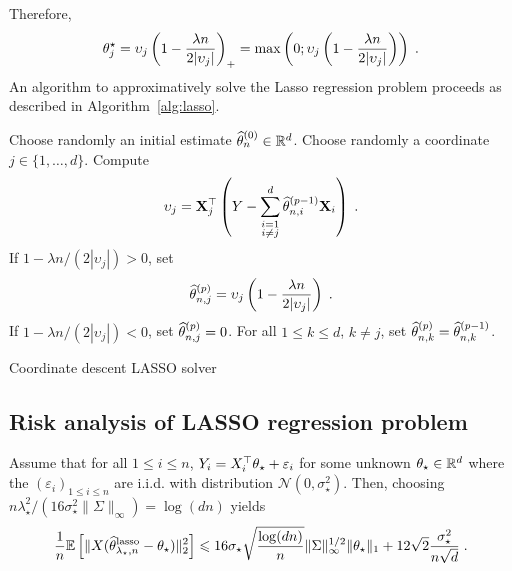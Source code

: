 Therefore,
\[
\theta_j^{\star} = \upsilon_j\left( 1 - \frac{\lambda n}{2 |\upsilon_j|}\right)_+ = \mathrm{max}\left(0;\upsilon_j\left( 1 - \frac{\lambda n}{2 |\upsilon_j|}\right)\right)\;.
\]
An algorithm to approximatively solve the Lasso regression problem proceeds as described in Algorithm~\ref{alg:lasso}.
\begin{algorithm}
\centering
\begin{algorithmic}
\State Choose randomly an initial estimate $\widehat {\theta}_n^{(0)}\in\mathbb{R}^d$.
\State Choose randomly a coordinate $j\in\{1,\ldots, d\}$.
\State Compute
\[
\upsilon_{j}={\bf X}^\top_{j}\left(Y-\sum_{\substack{i=1\\ i\neq j}}^d\widehat{\theta}^{(p-1)}_{n,i}{\bf X}_{i}\right)\;.
\]
\State If $1 - \lambda n/(2 |\upsilon_j|)>0$, set 
\[
\widehat{\theta}^{(p)}_{n,j}= \upsilon_j\left(1 - \frac{\lambda n }{2 |\upsilon_j|}\right)\;.
\]
\State If $1 - \lambda n/(2 |\upsilon_j|)<0$, set $\widehat{\theta}^{(p)}_{n,j}=0$.
\State For all $1\leqslant k \leqslant d$, $k\neq j$, set $\widehat{\theta}^{(p)}_{n,k} = \widehat{\theta}^{(p-1)}_{n,k}$.
\EndFor
\end{algorithmic}
\caption{Coordinate descent LASSO solver}
\label{alg:lasso}
\end{algorithm}

\subsection{Risk analysis of LASSO regression problem}
\begin{proposition}
Assume that for all $1\leqslant i \leqslant n$, $Y_i = X^\top_i \theta_{\star} + \varepsilon_i$ for some unknown $\theta_\star\in\mathbb{R}^d$ where the $(\varepsilon_i)_{1\leqslant i\leqslant n}$ are i.i.d. with distribution $\mathcal{N}(0,\sigma_\star^2)$. Then, choosing $n\lambda_\star^2/(16\sigma_\star^2  \|\Sigma\|_\infty) = \log(dn)$ yields
$$
\frac{1}{n}\mathbb{E}\left[\|X(\widehat{\theta}^{\mathrm{lasso}}_{\lambda_\star,n}-\theta_\star)\|_2^2\right] \leqslant  16\sigma_\star\sqrt{\frac{\log(dn)}{n}}\|\Sigma\|_\infty^{1/2}\|\theta_\star\|_1  + 12\sqrt{2}\frac{\sigma_\star^2}{n\sqrt{d}} \;.
$$
\end{proposition}

